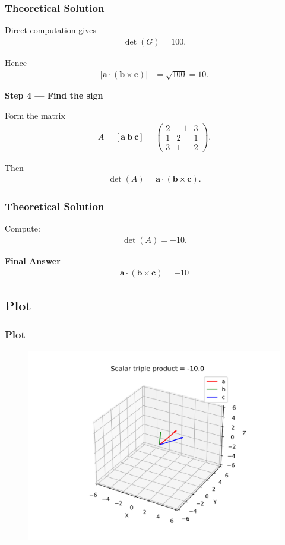 \documentclass{beamer}
\theoremstyle{remark}
\newcommand{\myvec}[1]{\ensuremath{\begin{pmatrix}#1\end{pmatrix}}}
\let\vec\mathbf
\numberwithin{equation}{section}
\begin{document}
\begin{frame}
\frametitle{Theoretical Solution}
Direct computation gives
\begin{align}
\det(G) = 100.
\end{align}

Hence
\begin{align}
|\vec{a} \cdot (\vec{b} \times \vec{c})| &= \sqrt{100} = 10.
\end{align}

\textbf{Step 4 — Find the sign}

Form the matrix
\begin{align}
A = [\vec{a}\ \vec{b}\ \vec{c}] =
\myvec{
2 & -1 & 3 \\
1 & 2  & 1 \\
3 & 1  & 2
}.
\end{align}

Then
\begin{align}
\det(A) = \vec{a} \cdot (\vec{b} \times \vec{c}).
\end{align}


\end{frame}

\begin{frame}
\frametitle{Theoretical Solution}
Compute:
\begin{align}
\det(A) = -10.
\end{align}

\textbf{Final Answer}
\begin{align}
\boxed{\ \vec{a} \cdot (\vec{b} \times \vec{c}) = -10\ }
\end{align}


\end{frame}



\subsection{Plot}
\begin{frame}
    \frametitle{Plot}
\begin{figure}[H]
   \centering
   \includegraphics[width=0.9\columnwidth]{figs/gram_triple_product.png}
   \end{figure}
\end{frame}
\end{document}
